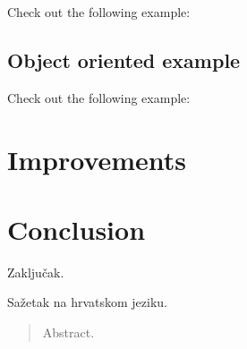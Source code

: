 \documentclass[times, utf8, diplomski]{fer}
\theoremstyle{definition}
\begin{document}
Check out the following example:


\section{Object oriented example}

Check out the following example:



\chapter{Improvements}










\chapter{Conclusion}
Zaključak.




\begin{sazetak}
Sažetak na hrvatskom jeziku.

\end{sazetak}

\begin{abstract}
Abstract.

\end{abstract}
\end{document}
